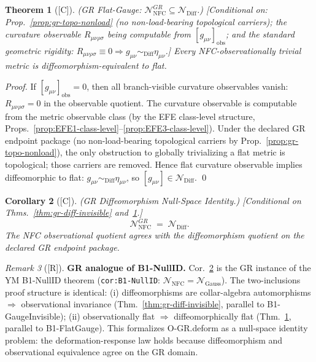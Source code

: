 \documentclass[12pt,oneside]{amsbook}
\theoremstyle{plain}
\newtheorem{theorem}{Theorem}[section]
\newtheorem{corollary}[theorem]{Corollary}
\theoremstyle{definition}
\theoremstyle{remark}
\newtheorem{remark}[theorem]{Remark}
\newcommand{\status}[1]{\textup{[#1]}}
\begin{document}
\begin{theorem}[\status{C}]\label{thm:gr-flat-gauge}
\textup{(GR Flat-Gauge: $\mathcal{N}_{\mathrm{NFC}}^{GR} \subseteq
\mathcal{N}_{\mathrm{Diff}}$.)}
\textup{[Conditional on: Prop.~\ref{prop:gr-topo-nonload}
(no non-load-bearing topological carriers); the curvature
observable $R_{\mu\nu\rho\sigma}$ being computable from
$[g_{\mu\nu}]_{\mathrm{obs}}$; and the standard
geometric rigidity: $R_{\mu\nu\rho\sigma} \equiv 0 \Rightarrow
g_{\mu\nu} \sim_{\mathrm{Diff}} \eta_{\mu\nu}$.]}
Every NFC-observationally trivial metric is diffeomorphism-equivalent
to flat.
\end{theorem}

\begin{proof}
If $[g_{\mu\nu}]_{\mathrm{obs}} = 0$, then all
branch-visible curvature observables vanish: $R_{\mu\nu\rho\sigma}
= 0$ in the observable quotient. The curvature observable is
computable from the metric observable class (by the EFE
class-level structure, Props.~\ref{prop:EFE1-class-level}--\ref{prop:EFE3-class-level}). Under the declared GR endpoint package
(no non-load-bearing topological carriers by
Prop.~\ref{prop:gr-topo-nonload}), the only obstruction to
globally trivializing a flat metric is topological; those
carriers are removed. Hence flat curvature observable implies
diffeomorphic to flat: $g_{\mu\nu} \sim_{\mathrm{Diff}}
\eta_{\mu\nu}$, so $[g_{\mu\nu}] \in \mathcal{N}_{\mathrm{Diff}}$.
\qed
\end{proof}

\begin{corollary}[\status{C}]\label{cor:gr-null-id}
\textup{(GR Diffeomorphism Null-Space Identity.)}
\textup{[Conditional on Thms.~\ref{thm:gr-diff-invisible}
and~\ref{thm:gr-flat-gauge}.]}
\[
 \mathcal{N}_{\mathrm{NFC}}^{GR} \;=\; \mathcal{N}_{\mathrm{Diff}}.
\]
The NFC observational quotient agrees with the diffeomorphism
quotient on the declared GR endpoint package.
\end{corollary}

\begin{remark}[\status{R}]\label{rem:gr-nullid-note}
\textbf{GR analogue of B1-NullID.}
Cor.~\ref{cor:gr-null-id} is the GR instance of the YM B1-NullID
theorem (\texttt{cor:B1-NullID}: $\mathcal{N}_{\mathrm{NFC}} =
\mathcal{N}_{\mathrm{Gauss}}$). The two-inclusions proof structure
is identical: (i) diffeomorphisms are collar-algebra automorphisms
$\Rightarrow$ observational invariance (Thm.~\ref{thm:gr-diff-invisible},
parallel to B1-GaugeInvisible); (ii) observationally flat $\Rightarrow$
diffeomorphically flat (Thm.~\ref{thm:gr-flat-gauge}, parallel to
B1-FlatGauge). This formalizes O-GR.deform as a null-space identity
problem: the deformation-response law holds because diffeomorphism
and observational equivalence agree on the GR domain.
\end{remark}
\end{document}

